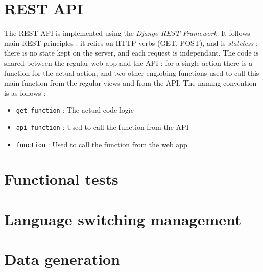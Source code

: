 \documentclass[a4paper, 11pt]{report}
\begin{document}
    \section{REST API}

    The REST API is implemented using the \textit{Django REST Framework}. It follows main REST principles : it relies on HTTP verbs (GET, POST), and is \textit{stateless} : there is no state kept on the server, and each request is independant. The code is shared between the regular web app and the API : for a single action there is a function for the actual action, and two other englobing functions used to call this main function from the regular views and from the API. The naming convention is as follows :

    \begin{itemize}
        \item \texttt{get\_function} : The actual code logic
        \item \texttt{api\_function} : Used to call the function from the API
        \item \texttt{function} : Used to call the function from the web app.
    \end{itemize}

    \section{Functional tests}

    \section{Language switching management}

    \section{Data generation}
\end{document}
